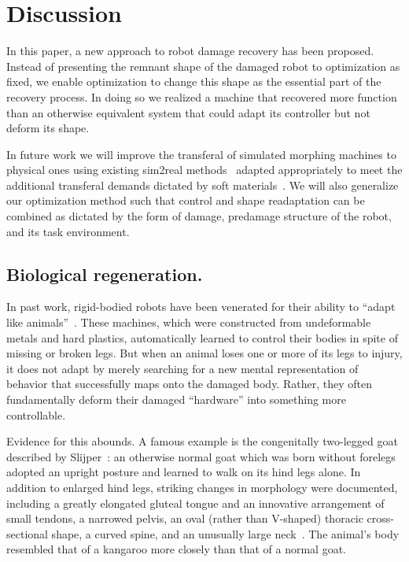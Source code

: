 \section{Discussion}
\label{sec5:discussion}


In this paper, a new approach to robot damage recovery has been proposed.
Instead of presenting the remnant shape of the damaged robot to optimization as 
fixed,
we enable optimization to change this shape as the essential part of the recovery process.
In doing so we realized a machine that recovered more function than an otherwise equivalent system that could adapt its controller but not deform its shape.

In future work we will improve the transferal of simulated morphing machines
to physical ones using existing sim2real methods~\cite{bharadhwaj2018data, bongard2006resilient, cully2015robots, hwangbo2019learning, kwiatkowski2019task, tan2018sim} adapted appropriately to meet the additional
transferal demands dictated by soft materials~\cite{matas2018sim}. 
We will also generalize our optimization method
such that control and shape readaptation can be combined as dictated by the form of damage, predamage structure of the robot, and its task environment.

\subsection*{Biological regeneration.}

In past work, rigid-bodied robots have been venerated for their ability to ``adapt like animals''~\cite{bongard2006resilient,cully2015robots}.
These machines, which were constructed from undeformable metals and hard plastics, 
automatically learned to control their bodies in spite of missing or broken legs.
But when an animal loses one or more of its legs to injury, it does not adapt by merely searching for a new mental representation of behavior that successfully maps onto the damaged body. 
Rather, they often fundamentally deform their damaged ``hardware'' into something more controllable.


Evidence for this abounds.
A famous example is the congenitally two-legged goat described by Slijper~\cite{slijper1942biologic}: 
an otherwise normal goat which was born without forelegs adopted an upright posture and learned to walk on its hind legs alone.
In addition to enlarged 
hind legs, 
striking changes in morphology were documented, including
a greatly elongated gluteal tongue and 
an innovative arrangement of small tendons,
a narrowed pelvis,
an oval (rather than V-shaped) thoracic cross-sectional shape,
a curved spine, 
and an unusually large neck~\cite{west2005developmental}.
The animal's body resembled that of a kangaroo more closely than that of a normal goat.


